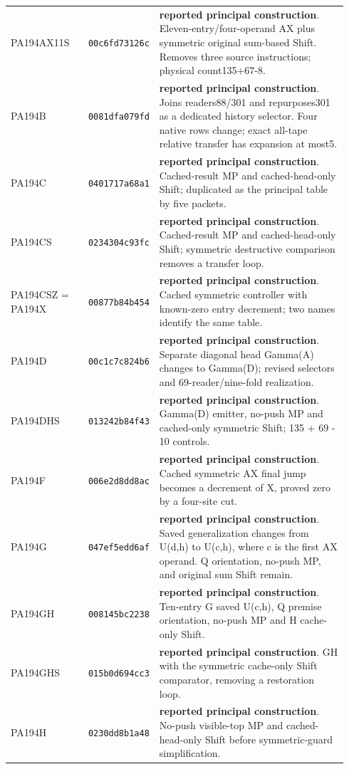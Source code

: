 {\begin{longtable}{@{}>{\raggedright\arraybackslash}p{0.23\linewidth}>{\raggedright\arraybackslash}p{0.145\linewidth}>{\raggedright\arraybackslash}p{0.56\linewidth}@{}}
PA194AX11S & \texttt{00c6fd73126c} & \textbf{reported principal construction}. Eleven-entry/four-operand AX plus symmetric original sum-based Shift. Removes three source instructions; physical count135+67-8.\\[4pt]
PA194B & \texttt{0081dfa079fd} & \textbf{reported principal construction}. Joins readers88/301 and repurposes301 as a dedicated history selector. Four native rows change; exact all-tape relative transfer has expansion at most5.\\[4pt]
PA194C & \texttt{0401717a68a1} & \textbf{reported principal construction}. Cached-result MP and cached-head-only Shift; duplicated as the principal table by five packets.\\[4pt]
PA194CS & \texttt{0234304c93fc} & \textbf{reported principal construction}. Cached-result MP and cached-head-only Shift; symmetric destructive comparison removes a transfer loop.\\[4pt]
PA194CSZ = PA194X & \texttt{00877b84b454} & \textbf{reported principal construction}. Cached symmetric controller with known-zero entry decrement; two names identify the same table.\\[4pt]
PA194D & \texttt{00c1c7c824b6} & \textbf{reported principal construction}. Separate diagonal head Gamma(A) changes to Gamma(D); revised selectors and 69-reader/nine-fold realization.\\[4pt]
PA194DHS & \texttt{013242b84f43} & \textbf{reported principal construction}. Gamma(D) emitter, no-push MP and cached-only symmetric Shift; 135 + 69 - 10 controls.\\[4pt]
PA194F & \texttt{006e2d8dd8ac} & \textbf{reported principal construction}. Cached symmetric AX final jump becomes a decrement of X, proved zero by a four-site cut.\\[4pt]
PA194G & \texttt{047ef5edd6af} & \textbf{reported principal construction}. Saved generalization changes from U(d,h) to U(c,h), where c is the first AX operand. Q orientation, no-push MP, and original sum Shift remain.\\[4pt]
PA194GH & \texttt{008145bc2238} & \textbf{reported principal construction}. Ten-entry G saved U(c,h), Q premise orientation, no-push MP and H cache-only Shift.\\[4pt]
PA194GHS & \texttt{015b0d694cc3} & \textbf{reported principal construction}. GH with the symmetric cache-only Shift comparator, removing a restoration loop.\\[4pt]
PA194H & \texttt{0230dd8b1a48} & \textbf{reported principal construction}. No-push visible-top MP and cached-head-only Shift before symmetric-guard simplification.\\[4pt]

\end{longtable}}
